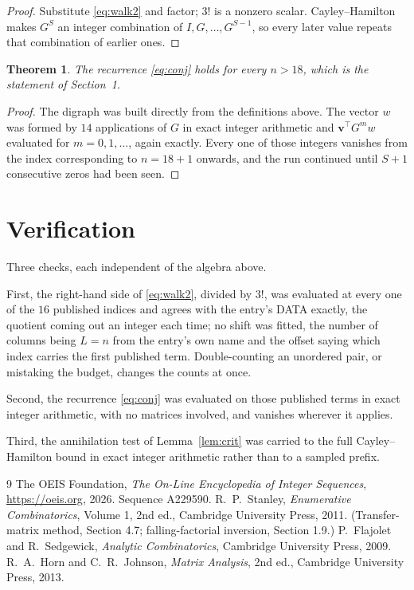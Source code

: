 \documentclass[11pt,a4paper]{article}
\theoremstyle{plain}
\newtheorem{theorem}{Theorem}
\theoremstyle{definition}
\begin{document}
\begin{proof}
Substitute \eqref{eq:walk2} and factor; $3!$ is a nonzero scalar. Cayley--Hamilton
makes $G^{S}$ an integer combination of $I,G,\dots,G^{S-1}$, so every later value repeats
that combination of earlier ones.
\end{proof}

\begin{theorem}
The recurrence \eqref{eq:conj} holds for every $n>18$, which is the statement of
Section~1.
\end{theorem}

\begin{proof}
The digraph was built directly from the definitions above. The vector $w$ was formed by
$14$ applications of $G$ in exact integer arithmetic and $\mathbf{v}^{\!\top}G^{m}w$
evaluated for $m=0,1,\dots$, again exactly. Every one of those integers vanishes from the
index corresponding to $n=18+1$ onwards, and the run continued until $S+1$ consecutive
zeros had been seen.
\end{proof}

\section{Verification}

Three checks, each independent of the algebra above.

First, the right-hand side of \eqref{eq:walk2}, divided by $3!$, was evaluated at every
one of the $16$ published indices and agrees with the entry's DATA exactly, the quotient
coming out an integer each time; no shift was fitted, the number of columns being $L=n$
from the entry's own name and the offset saying which index carries the first published term.
Double-counting an unordered pair, or mistaking the budget, changes the counts at once.

Second, the recurrence \eqref{eq:conj} was evaluated on those published terms in exact
integer arithmetic, with no matrices involved, and vanishes wherever it applies.

Third, the annihilation test of Lemma~\ref{lem:crit} was carried to the full
Cayley--Hamilton bound in exact integer arithmetic rather than to a sampled prefix.

\begin{thebibliography}{9}
 The OEIS Foundation, \emph{The On-Line Encyclopedia of Integer
Sequences}, \url{https://oeis.org}, 2026. Sequence A229590.
 R.~P.~Stanley, \emph{Enumerative Combinatorics}, Volume 1, 2nd ed.,
Cambridge University Press, 2011. (Transfer-matrix method, Section 4.7; falling-factorial
inversion, Section 1.9.)
 P.~Flajolet and R.~Sedgewick, \emph{Analytic Combinatorics}, Cambridge
University Press, 2009.
 R.~A.~Horn and C.~R.~Johnson, \emph{Matrix Analysis}, 2nd ed., Cambridge
University Press, 2013.
\end{thebibliography}
\end{document}
